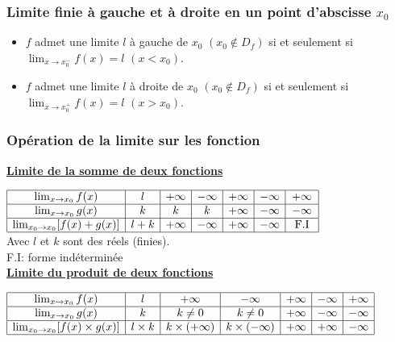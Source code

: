 \documentclass[a4paper, 12pt]{report}
\begin{document}
                \subsubsection{Limite finie à gauche et à droite en un point d'abscisse $x_0$}
                    \begin{itemize}
                        \item $f$ admet une limite $l$ à gauche de $x_0$ $(x_0\not\in D_f)$ si et seulement si $\lim_{x\to x_0^- }f(x)=l$ $(x<x_0)$.
                        \item $f$ admet une limite $l$ à droite de $x_0$ $(x_0\not\in D_f)$ si et seulement si $\lim_{x\to x_0^+ }f(x)=l$ $(x>x_0)$.
                    \end{itemize}
                \subsubsection{Opération de la limite sur les fonction}
                    \underline{\textbf{Limite de la somme de deux fonctions}}

                   $\begin{array}{|c|c|c|c|c|c|c|}
                        \hline
                        \lim_{x\to x_0}f(x)  &  l  & +\infty & -\infty & +\infty & -\infty & +\infty \\ \hline
                        \lim_{x\to x_0}g(x)  &  k  &    k    &   k     & +\infty & -\infty & -\infty \\ \hline
                \lim_{x_0\to x_0}[f(x)+g(x)] & l+k & +\infty & -\infty & +\infty & -\infty & \text{ F.I }  \\ \hline   

                    \end{array}$\\

                    Avec $l$ et $k$ sont des réels (finies).\\
                    F.I: forme indéterminée\\

                    \underline{\textbf{Limite du produit de deux fonctions}}


                   $\begin{array}{|c|c|c|c|c|c|c|}
                    \hline
                    \lim_{x\to x_0}f(x)  &     l     &      +\infty      &      -\infty      & +\infty & -\infty & +\infty \\ \hline
                    \lim_{x\to x_0}g(x)  &     k     &      k\neq 0      &      k\neq 0      & +\infty & -\infty & -\infty \\ \hline
    \lim_{x_0\to x_0}[f(x)\times g(x)]   & l\times k & k\times (+\infty) & k\times (-\infty) & +\infty & +\infty & -\infty \\ \hline              
                \end{array}$ \\ 
\end{document}
